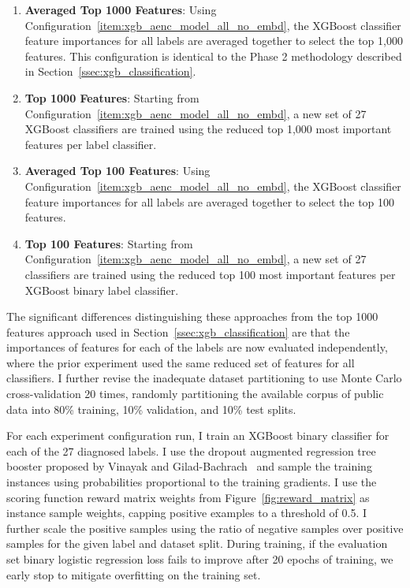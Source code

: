 \documentclass[\main/thesis.tex]{subfiles}
\begin{document}
\begin{enumerate}
    \item \label{item:xgb_aenc_model_avgd_top_1000_no_embd} \textbf{Averaged Top 1000 Features}: Using Configuration~\ref{item:xgb_aenc_model_all_no_embd}, the XGBoost classifier feature importances for all labels are averaged together to select the top 1,000 features. This configuration is identical to the Phase 2 methodology described in Section~\ref{ssec:xgb_classification}.
    \item \label{item:xgb_aenc_model_top_1000_no_embd} \textbf{Top 1000 Features}: Starting from Configuration~\ref{item:xgb_aenc_model_all_no_embd}, a new set of 27 XGBoost classifiers are trained using the reduced top 1,000 most important features per label classifier.
    \item \label{item:xgb_aenc_model_avgd_top_100_no_embd} \textbf{Averaged Top 100 Features}: Using Configuration~\ref{item:xgb_aenc_model_all_no_embd}, the XGBoost classifier feature importances for all labels are averaged together to select the top 100 features.
    \item \label{item:xgb_aenc_model_top_100_no_embd} \textbf{Top 100 Features}: Starting from Configuration~\ref{item:xgb_aenc_model_all_no_embd}, a new set of 27 classifiers are trained using the reduced top 100 most important features per XGBoost binary label classifier.
\end{enumerate}

The significant differences distinguishing these approaches from the top 1000 features approach used in Section~\ref{ssec:xgb_classification} are that the importances of features for each of the labels are now evaluated independently, where the prior experiment used the same reduced set of features for all classifiers.
I further revise the inadequate dataset partitioning to use Monte Carlo cross-validation 20 times, randomly partitioning the available corpus of public data into 80\% training, 10\% validation, and 10\% test splits.

For each experiment configuration run, I train an XGBoost binary classifier for each of the 27 diagnosed labels.
I use the dropout augmented regression tree booster proposed by Vinayak and Gilad-Bachrach~\cite{vinayak_dart_2015} and sample the training instances using probabilities proportional to the training gradients.
I use the scoring function reward matrix weights from Figure~\ref{fig:reward_matrix} as instance sample weights, capping positive examples to a threshold of 0.5.
I further scale the positive samples using the ratio of negative samples over positive samples for the given label and dataset split.
During training, if the evaluation set binary logistic regression loss fails to improve after 20 epochs of training, we early stop to mitigate overfitting on the training set.
\end{document}
